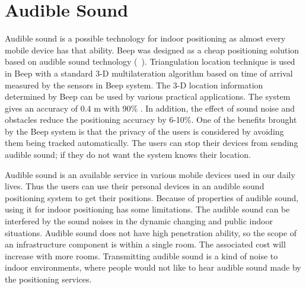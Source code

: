 \section{Audible Sound}
\label{sec:sound}
Audible sound is a possible technology for indoor positioning
as almost every mobile device has that ability.
Beep was designed as a cheap positioning solution 
based on audible sound technology (~\citet{lopes06}).
Triangulation location technique is used in Beep with a standard
3-D multilateration algorithm based on time of arrival measured
by the sensors in Beep system. The 3-D location information
determined by Beep can be used by various practical applications.
The system gives an accuracy of 0.4 m with 90\% . 
In addition, the effect of sound noise and obstacles reduce the positioning
accuracy by 6-10\%. One of the benefits brought by the Beep system is that the
privacy of the users is considered by avoiding them being
tracked automatically. The users can stop their devices from
sending audible sound; if they do not want the system knows
their location.

Audible sound is an available service in various mobile devices used
in our daily lives. Thus the users can use their personal devices
in an audible sound positioning system to get their positions.
Because of properties of audible sound, using it for indoor
positioning has some limitations. The audible sound can be
interfered by the sound noises in the dynamic changing and
public indoor situations. Audible sound does not have high
penetration ability, so the scope of an infrastructure component
is within a single room. The associated cost will increase 
with more rooms. Transmitting audible sound is a kind
of noise to indoor environments, where people would not like
to hear audible sound made by the positioning services.

